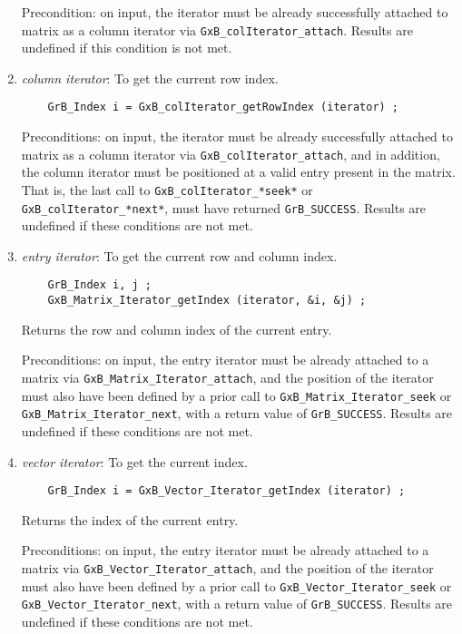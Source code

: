 \documentclass[12pt]{article}
\begin{document}
\begin{enumerate}
    Precondition: on input, the iterator must be already successfully attached
    to matrix as a column iterator via \verb'GxB_colIterator_attach'.
    Results are undefined if this condition is not met.

    \item {\em column iterator}:  To get the current row index.
    {\footnotesize
    \begin{verbatim}
    GrB_Index i = GxB_colIterator_getRowIndex (iterator) ; \end{verbatim}}

    Preconditions: on input, the iterator must be already successfully attached
    to matrix as a column iterator via \verb'GxB_colIterator_attach', and in
    addition, the column iterator must be positioned at a valid entry present in
    the matrix.  That is, the last call to \verb'GxB_colIterator_*seek*' or
    \verb'GxB_colIterator_*next*', must have returned \verb'GrB_SUCCESS'.
    Results are undefined if these conditions are not met.

    \item {\em entry iterator}: To get the current row and column index.
    {\footnotesize
    \begin{verbatim}
    GrB_Index i, j ;
    GxB_Matrix_Iterator_getIndex (iterator, &i, &j) ; \end{verbatim}}

    Returns the row and column index of the current entry.

    Preconditions: on input, the entry iterator must be already attached to a
    matrix via \verb'GxB_Matrix_Iterator_attach', and the position of the
    iterator must also have been defined by a prior call to
    \verb'GxB_Matrix_Iterator_seek' or \verb'GxB_Matrix_Iterator_next', with a
    return value of \verb'GrB_SUCCESS'.
    Results are undefined if these conditions are not met.

    \item {\em vector iterator}: To get the current index.
    {\footnotesize
    \begin{verbatim}
    GrB_Index i = GxB_Vector_Iterator_getIndex (iterator) ; \end{verbatim}}

    Returns the index of the current entry.

    Preconditions: on input, the entry iterator must be already attached to a
    matrix via \verb'GxB_Vector_Iterator_attach', and the position of the
    iterator must also have been defined by a prior call to
    \verb'GxB_Vector_Iterator_seek' or \verb'GxB_Vector_Iterator_next', with a
    return value of \verb'GrB_SUCCESS'.
    Results are undefined if these conditions are not met.

    \end{enumerate}
\end{document}
